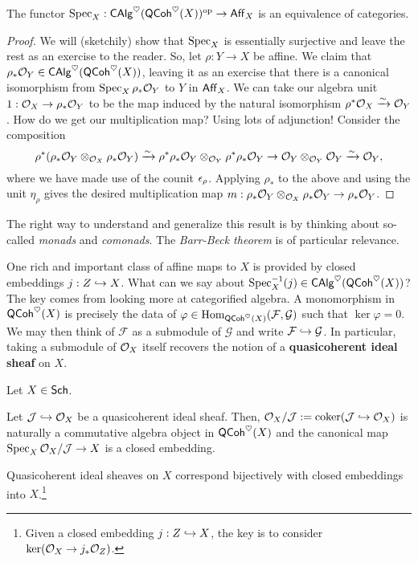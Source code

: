 \documentclass[11pt]{article}
\newcommand{\FF}{\mathcal{F}}
\newcommand{\GG}{\mathcal{G}}
\newcommand{\J}{\mathcal{J}}
\renewcommand{\phi}{\varphi}
\begin{document}
\begin{theorem}
The functor $\operatorname{Spec}_X: \operatorname{\mathsf{CAlg}}^{\heartsuit}(\operatorname{\mathsf{QCoh}}^{\heartsuit}(X))^{\operatorname{op}}\to\operatorname{\mathsf{Aff}}_X$ is an equivalence of categories.
\end{theorem}

\begin{proof}
We will (sketchily) show that $\operatorname{Spec}_X$ is essentially surjective and leave the rest as an exercise to the reader. So, let $\rho: Y\to X$ be affine. We claim that $\rho_*\mathcal{O}_Y\in\operatorname{\mathsf{CAlg}}^{\heartsuit}(\operatorname{\mathsf{QCoh}}^{\heartsuit}(X))$, leaving it as an exercise that there is a canonical isomorphism from $\operatorname{Spec}_X\rho_*\mathcal{O}_Y$ to $Y$ in $\operatorname{\mathsf{Aff}}_X$. We can take our algebra unit $1: \mathcal{O}_X\to\rho_*\mathcal{O}_Y$ to be the map induced by the natural isomorphism $\rho^*\mathcal{O}_X\xrightarrow{\sim}\mathcal{O}_Y$. How do we get our multiplication map? Using lots of adjunction! Consider the composition
$$\rho^*(\rho_*\mathcal{O}_Y\otimes_{\mathcal{O}_X}\rho_*\mathcal{O}_Y)\xrightarrow{\sim}\rho^*\rho_*\mathcal{O}_Y\otimes_{\mathcal{O}_Y}\rho^*\rho_*\mathcal{O}_Y\to\mathcal{O}_Y\otimes_{\mathcal{O}_Y}\mathcal{O}_Y\xrightarrow{\sim}\mathcal{O}_Y,$$
where we have made use of the counit $\epsilon_{\rho}$. Applying $\rho_*$ to the above and using the unit $\eta_{\rho}$ gives the desired multiplication map $m: \rho_*\mathcal{O}_Y\otimes_{\mathcal{O}_X}\rho_*\mathcal{O}_Y\to\rho_*\mathcal{O}_Y$.
\end{proof}

\begin{remark}
The right way to understand and generalize this result is by thinking about so-called \emph{monads} and \emph{comonads}. The \emph{Barr-Beck theorem} is of particular relevance.
\end{remark}

One rich and important class of affine maps to $X$ is provided by closed embeddings $j: Z\hookrightarrow X$. What can we say about $\operatorname{Spec}_X^{-1}(j)\in\operatorname{\mathsf{CAlg}}^{\heartsuit}(\operatorname{\mathsf{QCoh}}^{\heartsuit}(X))$? The key comes from looking more at categorified algebra. A monomorphism in $\operatorname{\mathsf{QCoh}}^{\heartsuit}(X)$ is precisely the data of $\phi\in\Hom_{\QCoh^{\heart}(X)}(\FF,\GG)$ such that $\ker\phi=0$. We may then think of $\FF$ as a submodule of $\GG$ and write $\FF\inj\GG$. In particular, taking a submodule of $\mathcal{O}_X$ itself recovers the notion of a \textbf{quasicoherent ideal sheaf} on $X$.

\begin{proposition}
Let $X\in\operatorname{\mathsf{Sch}}$.
\begin{enum}{\alph}
\item Let $\J\inj\O_X$ be a quasicoherent ideal sheaf. Then, $\O_X/\J:=\coker(\J\inj\O_X)$ is naturally a commutative algebra object in $\operatorname{\mathsf{QCoh}}^{\heartsuit}(X)$ and the canonical map $\Spec_X\O_X/\J\to X$ is a closed embedding.

\item Quasicoherent ideal sheaves on $X$ correspond bijectively with closed embeddings into $X$.\footnote{Given a closed embedding $j: Z\hookrightarrow X$, the key is to consider $\ker(\mathcal{O}_X\to j_*\mathcal{O}_Z)$.}
\end{enum}
\end{proposition}
\end{document}
